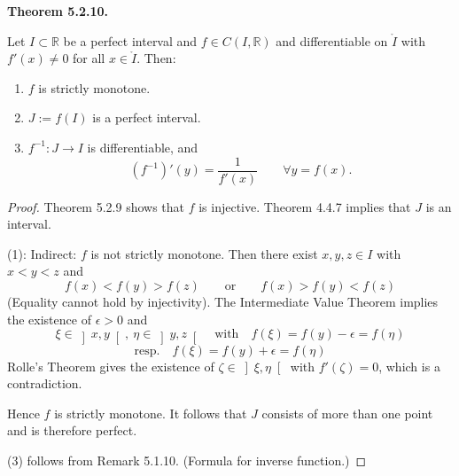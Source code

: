 \documentclass[12pt]{article}
\newenvironment{satz}[1]{%
  \par\vspace{6pt}\noindent\textbf{Theorem #1.}\itshape\space
}{%
  \par\vspace{6pt}
}
\begin{document}
\begin{satz}{5.2.10}
Let $I \subset \mathbb{R}$ be a perfect interval and $f \in C(I,\mathbb{R})$ and differentiable on $\mathring{I}$ with $f'(x) \neq 0$ for all $x \in \mathring{I}$. Then:
\begin{enumerate}
    \item $f$ is strictly monotone.
    \item $J := f(I)$ is a perfect interval.
    \item $f^{-1} : J \to I$ is differentiable, and
    \[
        (f^{-1})'(y) = \frac{1}{f'(x)} \qquad \forall y = f(x).
    \]
\end{enumerate}
\end{satz}

\begin{proof}
Theorem 5.2.9 shows that $f$ is injective. Theorem 4.4.7 implies that $J$ is an interval.

(1): Indirect: $f$ is not strictly monotone. Then there exist $x, y, z \in I$ with $x < y < z$ and
\[
    f(x) < f(y) > f(z) \qquad \text{or} \qquad f(x) > f(y) < f(z)
\]
(Equality cannot hold by injectivity). The Intermediate Value Theorem implies the existence of $\epsilon > 0$ and
\[
    \xi \in \left]x,y\right[,\ \eta \in \left]y,z\right[ \quad \text{with} \quad
    f(\xi) = f(y) - \epsilon = f(\eta)
\]
\[
    \text{resp.} \quad f(\xi) = f(y) + \epsilon = f(\eta)
\]
Rolle's Theorem gives the existence of $\zeta \in \left]\xi,\eta\right[$ with $f'(\zeta) = 0$, which is a contradiction.

Hence $f$ is strictly monotone. It follows that $J$ consists of more than one point and is therefore perfect.

(3) follows from Remark 5.1.10. (Formula for inverse function.)
\end{proof}
\end{document}
